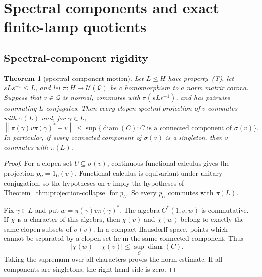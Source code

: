 \documentclass[11pt]{amsart}
\newcommand{\leanverified}[2]{\ignorespaces}
\newtheorem{theorem}{Theorem}[section]
\theoremstyle{definition}
\theoremstyle{remark}
\theoremstyle{plain}
\newcommand{\U}{\mathcal U}
\newcommand{\opnorm}[1]{\left\lVert #1\right\rVert}
\begin{document}
\section{Spectral components and exact finite-lamp quotients}
\label{sec:spectral-visible-notes}

\subsection{Spectral-component rigidity}

\begin{theorem}[spectral-component motion]\label{thm:notes-spectral-motion}
Let $L\le H$ have property~\textup{(T)}, let $sLs^{-1}\le L$, and let
$\pi\colon H\to\U(\mathcal Q)$ be a homomorphism to a norm matrix corona.
Suppose that $v\in\mathcal Q$ is normal, commutes with
$\pi(sLs^{-1})$, and has pairwise commuting $L$-conjugates.  Then every
clopen spectral projection of $v$ commutes with $\pi(L)$ and, for
$\gamma\in L$,
\[
 \opnorm{\pi(\gamma)v\pi(\gamma)^*-v}
 \le
 \sup\{\operatorname{diam}(C):
 C\text{ is a connected component of }\sigma(v)\}.
\]
In particular, if every connected component of $\sigma(v)$ is a singleton,
then $v$ commutes with $\pi(L)$.
\leanverified{Manuscript/SpectralPaper/MainTheorems}{GroupApproximation.SpectralPaper.spectralCompressionTheorem}
\leanverified{Manuscript/SpectralPaper/MainTheorems}{GroupApproximation.SpectralPaper.zeroDimensionalSpectralCollapseTheorem}
\end{theorem}

\begin{proof}
For a clopen set $U\subseteq\sigma(v)$, continuous functional calculus gives
the projection $p_U=1_U(v)$.  Functional calculus is equivariant under
unitary conjugation, so the hypotheses on $v$ imply the hypotheses of
Theorem~\ref{thm:projection-collapse} for $p_U$.  So every $p_U$ commutes
with $\pi(L)$.

Fix $\gamma\in L$ and put $w=\pi(\gamma)v\pi(\gamma)^*$.  The algebra
$C^*(1,v,w)$ is commutative.  If $\chi$ is a character of this algebra, then
$\chi(v)$ and $\chi(w)$ belong to exactly the same clopen subsets of
$\sigma(v)$.  In a compact Hausdorff space, points which cannot be separated
by a clopen set lie in the same connected component.  Thus
\[
 |\chi(w)-\chi(v)|
 \le \sup_C\operatorname{diam}(C).
\]
Taking the supremum over all characters proves the norm estimate.  If all
components are singletons, the right-hand side is zero.
\end{proof}
\end{document}
